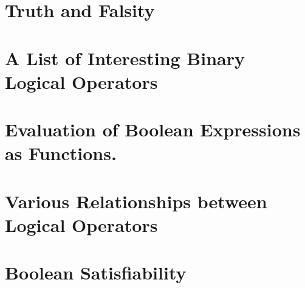 


\section{Truth and Falsity}


\section{A List of Interesting Binary Logical Operators}


\section{Evaluation of Boolean Expressions as Functions.}


\section{Various Relationships between Logical Operators}


\section{Boolean Satisfiability}
